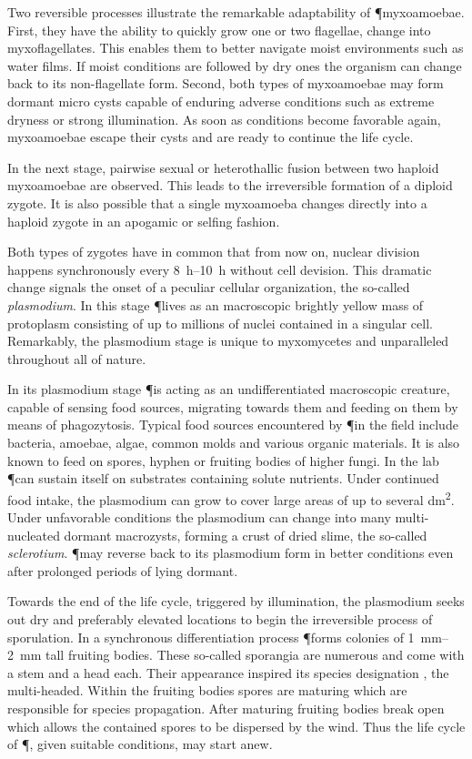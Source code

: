 		Two reversible processes illustrate the remarkable adaptability of \P myxoamoebae. First, they have the ability to quickly grow one or two flagellae, \ie change into myxoflagellates. This enables them to better navigate moist environments such as water films. If moist conditions are followed by dry ones the organism can change back to its non-flagellate form. Second, both types of myxoamoebae may form dormant micro cysts capable of enduring adverse conditions such as extreme dryness or strong illumination. As soon as conditions become favorable again, myxoamoebae escape their cysts and are ready to continue the life cycle.

		In the next stage, pairwise sexual or heterothallic fusion between two haploid myxoamoebae are observed. This leads to the irreversible formation of a diploid zygote. It is also possible that a single myxoamoeba changes directly into a haploid zygote in an apogamic or selfing fashion.

		Both types of zygotes have in common that from now on, nuclear division happens synchronously every \SIrange{8}{10}{\hour} without cell devision. This dramatic change signals the onset of a peculiar cellular organization, the so-called \emph{plasmodium}. In this stage \P lives as an macroscopic brightly yellow mass of protoplasm consisting of up to millions of nuclei contained in a singular cell. Remarkably, the plasmodium stage is unique to myxomycetes and unparalleled throughout all of nature.

		In its plasmodium stage \P is acting as an undifferentiated macroscopic creature, capable of sensing food sources, migrating towards them and feeding on them by means of phagozytosis. Typical food sources encountered by \P in the field include bacteria, amoebae, algae, common molds and various organic materials. It is also known to feed on spores, hyphen or fruiting bodies of higher fungi. In the lab \P can sustain itself on substrates containing solute nutrients. Under continued food intake, the plasmodium can grow to cover large areas of up to  several \si{\deci\metre\squared}. Under unfavorable conditions the plasmodium can change into many multi-nucleated dormant macrozysts, forming a crust of dried slime, the so-called \emph{sclerotium}. \P may reverse back to its plasmodium form in better conditions even after prolonged periods of lying dormant. 

		Towards the end of the life cycle, triggered by illumination, the plasmodium seeks out dry and preferably elevated locations to begin the irreversible process of sporulation. In a synchronous differentiation process \P forms colonies of \SIrange{1}{2}{\milli\metre} tall fruiting bodies. These so-called sporangia are numerous and come with a stem and a head each. Their appearance inspired its species designation \Pp, the multi-headed. Within the fruiting bodies spores are maturing which are responsible for species propagation. After maturing fruiting bodies break open which allows the contained spores to be dispersed by the wind. Thus the life cycle of \P, given suitable conditions, may start anew.

